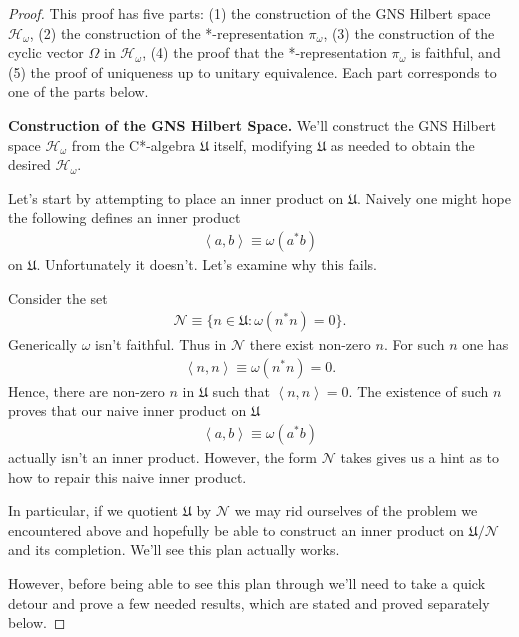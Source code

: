 \begin{proof}
    \leanok
This proof has five parts: (1) the construction of the GNS Hilbert space $\mathcal{H}_\omega$, (2) the construction of the *-representation $\pi_\omega$, (3) the construction of the cyclic vector $\Omega$ in $\mathcal{H}_\omega$, (4) the proof that the *-representation $\pi_\omega$ is faithful, and (5) the proof of uniqueness up to unitary equivalence. Each part corresponds to one of the parts below.

\noindent\textbf{Construction of the GNS Hilbert Space.}
We'll construct the GNS Hilbert space $\mathcal{H}_\omega$ from the C*-algebra $\mathfrak{U}$ itself, modifying $\mathfrak{U}$ as needed to obtain the desired $\mathcal{H}_\omega$.

Let's start by attempting to place an inner product on $\mathfrak{U}$. Naively one might hope the following defines an inner product
\begin{align}
    \left< a, b \right> \equiv \omega(a^*b)
\end{align}
on $\mathfrak{U}$. Unfortunately it doesn't. Let's examine why this fails.

Consider the set
\begin{align}
    \mathcal{N} \equiv \{ n \in \mathfrak{U} : \omega(n^*n) = 0 \}.
\end{align}
Generically $\omega$ isn't faithful. Thus in $\mathcal{N}$ there exist non-zero $n$. For such $n$ one has
\begin{align}
    \left< n, n \right> \equiv \omega(n^*n) = 0.
\end{align}
Hence, there are non-zero $n$ in $\mathfrak{U}$ such that $\left< n, n \right> = 0$. The existence of such $n$ proves that our naive inner product on $\mathfrak{U}$
\begin{align}
    \left< a, b \right> \equiv \omega(a^*b)
\end{align}
actually isn't an inner product. However, the form $\mathcal{N}$ takes gives us a hint as to how to repair this naive inner product.

In particular, if we quotient $\mathfrak{U}$ by $\mathcal{N}$ we may rid ourselves of the problem we encountered above and hopefully be able to construct an inner product on $\mathfrak{U} / \mathcal{N}$ and its completion. We'll see this plan actually works.

However, before being able to see this plan through we'll need to take a quick detour and prove a few needed results, which are stated and proved separately below.


\end{proof}
